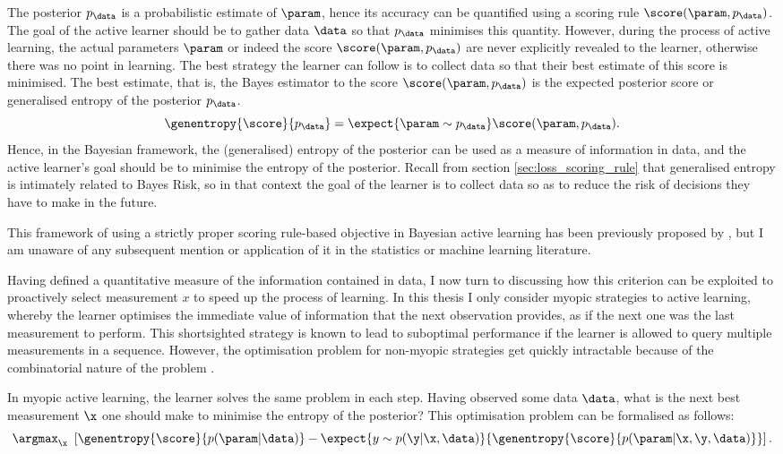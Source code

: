 The posterior $p_\data$ is a probabilistic estimate of $\param$, hence its accuracy can be quantified using a scoring rule $\score(\param,p_\data)$. The goal of the active learner should be to gather data $\data$ so that $p_\data$ minimises this quantity. However, during the process of active learning, the actual parameters $\param$ or indeed the score $\score(\param,p_\data)$ are never explicitly revealed to the learner, otherwise there was no point in learning. The best strategy the learner can follow is to collect data so that their best estimate of this score is minimised. The best estimate, that is, the Bayes estimator to the score $\score(\param,p_\data)$ is the expected posterior score or generalised entropy of the posterior $p_\data$.
%
\begin{equation}
	\genentropy{\score}{p_\data} = \expect{\param\sim p_\data} \score(\param,p_\data).
\end{equation}
%
Hence, in the Bayesian framework, the (generalised) entropy of the posterior can be used as a measure of information in data, and the active learner's goal should be to minimise the entropy of the posterior. Recall from section \ref{sec:loss_scoring_rule} that generalised entropy is intimately related to Bayes Risk, so in that context the goal of the learner is to collect data so as to reduce the risk of decisions they have to make in the future.

This framework of using a strictly proper scoring rule-based objective in Bayesian active learning has been previously proposed by \citet{Dawid1994}, but I am unaware of any subsequent mention or application of it in the statistics or machine learning literature.

Having defined a quantitative measure of the information contained in data, I now turn to discussing how this criterion can be exploited to proactively select measurement $x$ to speed up the process of learning. In this thesis I only consider myopic strategies to active learning, whereby the learner optimises the immediate value of information that the next observation provides, as if the next one was the last measurement to perform. This shortsighted strategy is known to lead to suboptimal performance if the learner is allowed to query multiple measurements in a sequence. However, the optimisation problem for non-myopic strategies get quickly intractable because of the combinatorial nature of the problem \citep{Krause2007}.

In myopic active learning, the learner solves the same problem in each step. Having observed some data $\data$, what is the next best measurement $\x$ one should make to minimise the entropy of the posterior? This optimisation problem can be formalised as follows:
%
\begin{equation}
	\argmax_\x\ \left[ \genentropy{\score}{p(\param\vert\data)} - \expect{y\sim p(\y\vert \x, \data)}{\genentropy{\score}{p(\param\vert \x,\y,\data)} }\right ].
	\label{eqn:active_learning_optimisation_criterion}
\end{equation}


